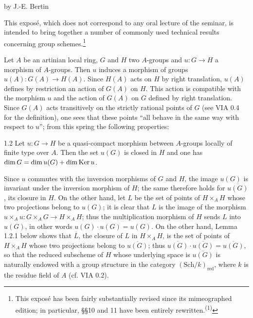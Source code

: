 \label{VIB}
\begin{center}by J.-E. Bertin\end{center}
\setcounter{footnote}{-1}
This exposé, which does not correspond to any oral lecture of the seminar, is intended to bring together a number of commonly used technical results concerning group schemes.\begingroup\renewcommand{\thefootnote}{*}\footnote{This exposé has been fairly substantially revised since its mimeographed edition; in particular, §§10 and 11 have been entirely rewritten.\textsuperscript{(1)}}\endgroup
{}

Let $A$ be an artinian local ring, $G$ and $H$ two $A$-groups and $u:G\to H$ a morphism of $A$-groups. Then $u$ induces a morphism of groups $u(A):G(A)\to H(A)$. Since $H(A)$ acts on $H$ by right translation, $u(A)$ defines by restriction an action of $G(A)$ on $H$. This action is compatible with the morphism $u$ and the action of $G(A)$ on $G$ defined by right translation. Since $G(A)$ acts transitively on the strictly rational points of $G$ (see VIA 0.4 for the definition), one sees that these points ``all behave in the same way with respect to $u$''; from this spring the following properties:
\begin{proposition}{1.2}\label{VIB.1.2}
Let $u:G\to H$ be a quasi-compact morphism between $A$-groups locally of finite type over $A$. Then the set $u(G)$ is closed in $H$ and one has $\dim G=\dim u(G)+\dim\operatorname{Ker} u$.
\end{proposition}
Since $u$ commutes with the inversion morphisms of $G$ and $H$, the image $u(G)$ is invariant under the inversion morphism of $H$; the same therefore holds for $\overline{u(G)}$, its closure in $H$. On the other hand, let $L$ be the set of points of $H\times_AH$ whose two projections belong to $u(G)$; it is clear that $L$ is the image of the morphism $u\times_Au:G\times_AG\to H\times_AH$; thus the multiplication morphism of $H$ sends $L$ into $u(G)$, in other words $u(G)\cdot u(G)=u(G)$. On the other hand, Lemma 1.2.1 below shows that $\overline L$, the closure of $L$ in $H\times_AH$, is the set of points of $H\times_AH$ whose two projections belong to $\overline{u(G)}$; thus $\overline{u(G)}\cdot\overline{u(G)}=\overline{u(G)}$, so that the reduced subscheme of $H$ whose underlying space is $\overline{u(G)}$ is naturally endowed with a group structure in the category $(\mathrm{Sch}/k)_{\mathrm{red}}$, where $k$ is the residue field of $A$ (cf. VIA 0.2).

